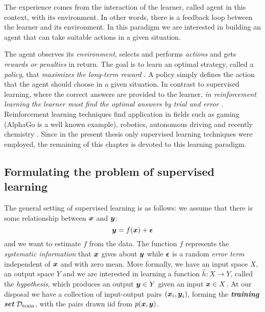 \begin{definition}
	The experience comes from the interaction of the learner, called
	agent in this context, with its environment. In other words,
	there is a feedback loop between the learner and its environment. In this
	paradigm we are interested in building an agent that can take suitable
	actions in a given situation.
\end{definition}

The agent observes its \emph{environment}, selects and performs \emph{actions}
and gets \emph{rewards or penalties} in return. The goal is to learn an optimal
strategy, called a \emph{policy}, that \emph{maximizes the long-term reward}
\parencite{ml}. A policy simply defines the action that the agent should
choose in a given situation. In contrast to supervised learning, where the
correct answers are provided to the learner, \emph{in reinforcement learning the
learner must find the optimal answers by trial and error}
\parencite{bishop2007}. Reinforcement learning techniques find application in
fields such as gaming (AlphaGo is a well known example), robotics, autonomous
driving and recently chemistry \parencite{li, Gow2022}. Since in the present
thesis only supervised learning techniques were employed, the remaining of this
chapter is devoted to this learning paradigm.

\subsection{Formulating the problem of supervised learning}

The general setting of supervised learning is as follows: we assume that there
is some relationship between $\boldsymbol{x}$ and $\boldsymbol{y}$:
\begin{equation}
	\label{eq:supervised}
	\boldsymbol{y} = f(\boldsymbol{x}) + \boldsymbol{\epsilon}
\end{equation}
and we want to estimate $f$ from the data. The function $f$ represents the
\emph{systematic information} that $\boldsymbol{x}$ gives about $\boldsymbol{y}$ while
$\boldsymbol{\epsilon}$ is a random \emph{error term} independent of
$\boldsymbol{x}$ and with zero mean. More formally, we have an input space $X$, an output
space $Y$ and we are interested in learning a function $\hat{h} \colon X \to Y$,
called the \emph{hypothesis}, which produces
an output $\boldsymbol{y} \in Y$ given an input $\boldsymbol{x} \in X$. At our disposal we have a
collection of input-output pairs $(\boldsymbol{x}_i, \boldsymbol{y}_i)$, forming the
\emph{\textbf{training set}} $\mathcal{D}_\text{train}$, with the pairs drawn
\acrshort{iid} from $p(\boldsymbol{x}, \boldsymbol{y})$.

